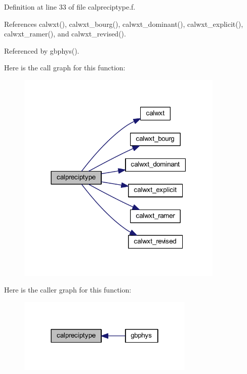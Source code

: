 Definition at line 33 of file calpreciptype.\+f.



References calwxt(), calwxt\+\_\+bourg(), calwxt\+\_\+dominant(), calwxt\+\_\+explicit(), calwxt\+\_\+ramer(), and calwxt\+\_\+revised().



Referenced by gbphys().



Here is the call graph for this function\+:\nopagebreak
\begin{figure}[H]
\begin{center}
\leavevmode
\includegraphics[width=279pt]{calpreciptype_8f_a8a471b8f23f55928b69814c887ec925a_cgraph}
\end{center}
\end{figure}




Here is the caller graph for this function\+:\nopagebreak
\begin{figure}[H]
\begin{center}
\leavevmode
\includegraphics[width=238pt]{calpreciptype_8f_a8a471b8f23f55928b69814c887ec925a_icgraph}
\end{center}
\end{figure}


